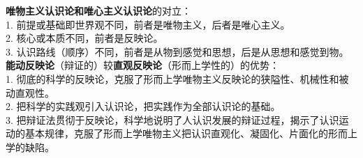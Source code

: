 {\textbf{唯物主义认识论和唯心主义认识论}}的对立：\\
1. 前提或基础即世界观不同，前者是唯物主义，后者是唯心主义。\\
2. 核心或本质不同，前者是反映论。\\
3.
认识路线（顺序）不同，前者是从物到感觉和思想，后是从思想和感觉到物。\\[2\baselineskip]{\textbf{能动反映论}}（辩证的）较\textbf{{直观反映论}}（形而上学性的）的优势：\\
1.
彻底的科学的反映论，克服了形而上学唯物主义反映论的狭隘性、机械性和被动直观性。\\
2. 把科学的实践观引入认识论，把实践作为全部认识论的基础。\\
3.
把辩证法贯彻于反映论，科学地说明了人认识发展的辩证过程，揭示了认识运动的基本规律，克服了形而上学唯物主义把认识直观化、凝固化、片面化的形而上学的缺陷。\\[2\baselineskip]
